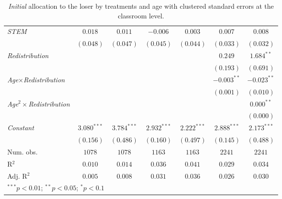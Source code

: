 \begin{table}[H]
\begin{center}
\begin{footnotesize}
\begin{tabular}{l c c c c c c}
\textit{STEM}                                 & $0.018$       & $0.011$       & $-0.006$       & $0.003$        & $0.007$        & $0.008$        \\
                                              & $(0.048)$     & $(0.047)$     & $(0.045)$      & $(0.044)$      & $(0.033)$      & $(0.032)$      \\
\textit{Redistribution}                       &               &               &                &                & $0.249$        & $1.684^{**}$   \\
                                              &               &               &                &                & $(0.193)$      & $(0.691)$      \\
\textit{Age}$\times$\textit{Redistribution}   &               &               &                &                & $-0.003^{**}$  & $-0.023^{**}$  \\
                                              &               &               &                &                & $(0.001)$      & $(0.010)$      \\
\textit{Age}$^2\times$\textit{Redistribution} &               &               &                &                &                & $0.000^{**}$   \\
                                              &               &               &                &                &                & $(0.000)$      \\
\textit{Constant}                             & $3.080^{***}$ & $3.784^{***}$ & $2.932^{***}$  & $2.222^{***}$  & $2.888^{***}$  & $2.173^{***}$  \\
                                              & $(0.156)$     & $(0.486)$     & $(0.160)$      & $(0.497)$      & $(0.145)$      & $(0.488)$      \\
\midrule
Num. obs.                                     & $1078$        & $1078$        & $1163$         & $1163$         & $2241$         & $2241$         \\
R$^2$                                         & $0.010$       & $0.014$       & $0.036$        & $0.041$        & $0.029$        & $0.034$        \\
Adj. R$^2$                                    & $0.005$       & $0.008$       & $0.031$        & $0.036$        & $0.026$        & $0.030$        \\
\bottomrule
\multicolumn{7}{l}{\footnotesize{$^{***}p<0.01$; $^{**}p<0.05$; $^{*}p<0.1$}}
\end{tabular}
\end{footnotesize}
\caption{\textit{Initial} allocation to the loser by treatments and age with clustered standard errors at the classroom level.}
\label{table-b3-initial-class}
\end{center}
\end{table}

